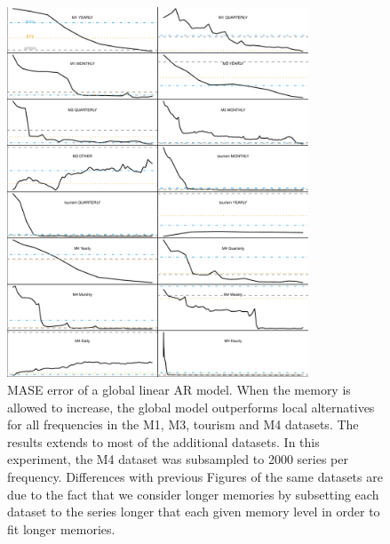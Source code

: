 \documentclass[a4paper]{article}
\theoremstyle{custom}
\begin{document}
\begin{figure}[!hb]
  \centering
  \includegraphics[width=0.8\textwidth]{fig/longmem.pdf}
  \caption{MASE error of a global linear AR model. When the memory is allowed to increase, the global model outperforms local alternatives for all frequencies in the M1, M3, tourism and M4 datasets. The results extends to most of the additional datasets. In this experiment, the M4 dataset was subsampled to 2000 series per frequency. Differences with previous Figures of the same datasets are due to the fact that we consider longer memories by subsetting each dataset to the series longer that each given memory level in order to fit longer memories.}
  \label{fig:longmemextra}
\end{figure}
\end{document}
